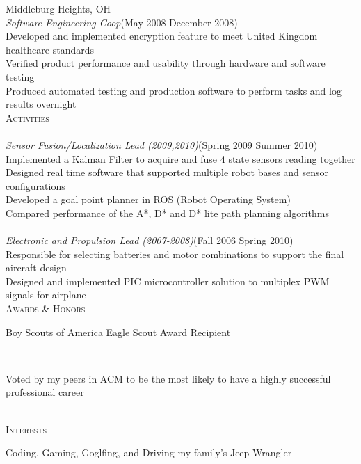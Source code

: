 \documentclass[11pt,letterpaper]{article}
\newcommand{\SectionHeader}[1]{\textsc{#1} \vspace{-2px}\\}
\newcommand{\CompanyHeader}[4]{\hspace*{.52in}{\bf#1} \hfill #2 \\\hspace*{.5in}\emph{#3}\hfill (#4) \vspace{-2px} \\}
\newcommand{\ResumeItem}[1]{\hspace*{.5in}\textopenbullet\hspace*{.2in}#1\\}
\newcommand{\TextBlock}[1]
{\hspace*{.5in} \begin{minipage}[t]{\textwidth -.5in} #1 \end{minipage}\\}
\begin{document}
 \CompanyHeader{Codonics}{Middleburg Heights, OH}{Software Engineering Coop}{May 2008 \textendash
 { }December 2008}
 \ResumeItem{Developed and implemented encryption feature to meet United Kingdom healthcare standards}
 \ResumeItem{Verified product performance and usability through hardware and software testing}
 \ResumeItem{Produced automated testing and production software to perform tasks and log results overnight} 
\SectionHeader{Activities}
\CompanyHeader{Intelligent Ground Vehicle Competition (IGVC)}{}{Sensor Fusion/Localization Lead (2009,2010)}{Spring 2009 \textendash { }Summer 2010}
 \ResumeItem{Implemented a Kalman Filter to acquire and fuse 4 state sensors reading together}
 \ResumeItem{Designed real time software that supported multiple  robot bases and sensor configurations}
 \ResumeItem{Developed a goal point planner in ROS (Robot Operating System)}
 \ResumeItem{Compared performance of the A*, D* and D* lite path planning algorithms}
 \CompanyHeader{Design Build Fly/DBF}{}{Electronic and Propulsion Lead (2007-2008)}{Fall 2006 \textendash { }Spring 2010}
 \ResumeItem{Responsible for selecting batteries and motor combinations to support the final aircraft design}
\ResumeItem{Designed and implemented PIC microcontroller solution to multiplex PWM signals for airplane}
\SectionHeader{Awards \& Honors}
\TextBlock{Boy Scouts of America Eagle Scout Award Recipient}
\TextBlock{Voted by my peers in ACM to be the most likely to have a highly successful professional career}
\SectionHeader{Interests}
\TextBlock{Coding, Gaming, Goglfing, and Driving my family's Jeep Wrangler}
\end{document}
